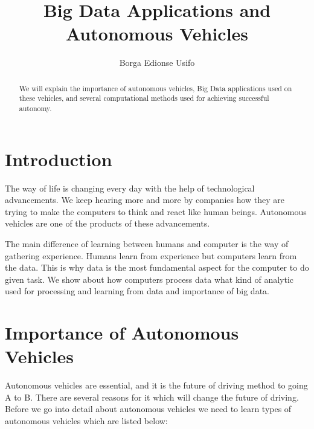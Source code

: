\documentclass[sigconf]{acmart}
\begin{document}
\title{Big Data Applications and Autonomous Vehicles}

\author{Borga Edionse Usifo}

\renewcommand{\shortauthors}{B. Usifo et al.}

\maketitle

\begin{abstract}
We will explain the importance of autonomous vehicles, Big Data applications used on these vehicles, and several computational methods used for achieving successful autonomy. 
\end{abstract}

\section{Introduction}
The way of life is changing every day with the help of technological advancements. We keep hearing more and more by companies how they are trying to make the computers to think and react like human beings. Autonomous vehicles are one of the products of these advancements. 
\par The main difference of learning between humans and computer is the way of gathering experience. Humans learn from experience but computers learn from the data. This is why data is the most fundamental aspect for the computer to do given task. We show about how computers process data what kind of analytic used for processing and learning from data and importance of big data.    

\section{Importance of Autonomous Vehicles}

Autonomous vehicles are essential, and it is the future of driving method to going A to B. There are several reasons for it which will change the future of driving. Before we go into detail about autonomous vehicles we need to learn types of autonomous vehicles which are listed below: 
\end{document}
